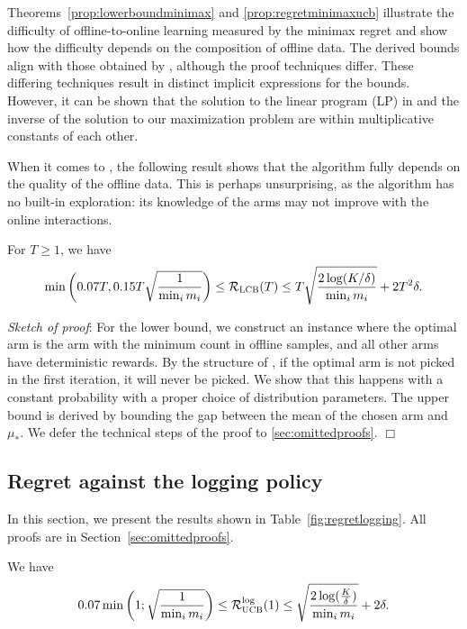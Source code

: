 Theorems~\ref{prop:lowerboundminimax} and \ref{prop:regretminimaxucb} illustrate the difficulty of offline-to-online learning measured by the minimax regret and show how the difficulty depends on the composition of offline data. The derived bounds align with those obtained by \cite{pmlr-v235-cheung24a}, although the proof techniques differ. These differing techniques result in distinct implicit expressions for the bounds. However, it can be shown that the solution to the linear program (LP) in \cite{pmlr-v235-cheung24a} and the inverse of the solution to our maximization problem are within multiplicative constants of each other.



When it comes to \alglcb, the following result shows that the algorithm fully depends on the quality of the offline data. This is perhaps unsurprising, as the algorithm has no built-in exploration: its knowledge of the arms may not improve with the online interactions. 

\begin{proposition}\label{prop:minimaxregretlcb}
    For $T\geq 1$, we have
    \[
   \min\left(0.07 T, 0.15 T\sqrt{\frac{1}{\min_i m_i}}\right)\leq  \mathcal{R}_\textsc{LCB}(T) \leq T\sqrt{\frac{2\log(K/\delta)}{\min_i m_i}}+ 2T^2\delta.
    \]
\end{proposition}
\textit{Sketch of proof}: For the lower bound, we construct an instance where the optimal arm is the arm with the minimum count in offline samples, and all other arms have deterministic rewards. By the structure of \alglcb, if the optimal arm is not picked in the first iteration, it will never be picked. We show that this happens with a constant probability with a proper choice of distribution parameters. The upper bound is derived by bounding the gap between the mean of the chosen arm and $\mu_*$. We defer the technical steps of the proof to \cref{sec:omittedproofs}. \hfill \(\Box\)



\subsection{Regret against the logging policy}


In this section, we present the results shown in Table~\ref{fig:regretlogging}. All proofs are in Section~\ref{sec:omittedproofs}. 

\begin{proposition}[\algucb's regret against the logging policy for $T=1$]\label{prop:loginucbT=1}
We have
\[
0.07\min \left(1;\sqrt{\frac{1}{\min_i m_i}}\right)\leq \mathcal{R}^{\text{log}}_\textsc{UCB}(1) \leq \sqrt{\frac{2\log(\frac{K}{\delta})}{\min_i m_i}}+2\delta.
\]
\end{proposition}

